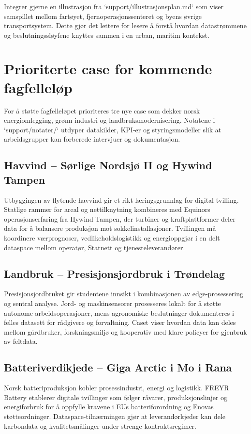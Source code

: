 Integrer gjerne en illustrasjon fra `support/illustrasjonsplan.md` som viser samspillet mellom fartøyet, fjernoperasjonssenteret og byens øvrige transportsystem. Dette gjør det lettere for lesere å forstå hvordan datastrømmene og beslutningssløyfene knyttes sammen i en urban, maritim kontekst.

\section{Prioriterte case for kommende fagfelleløp}
For å støtte fagfelleløpet prioriteres tre nye case som dekker norsk energiomlegging, grønn industri og landbruksmodernisering. Notatene i `support/notater/` utdyper datakilder, KPI-er og styringsmodeller slik at arbeidsgrupper kan forberede intervjuer og dokumentasjon.

\subsection*{Havvind – Sørlige Nordsjø II og Hywind Tampen}
Utbyggingen av flytende havvind gir et rikt læringsgrunnlag for digital tvilling. Statlige rammer for areal og nettilknytning kombineres med Equinors operasjonserfaring fra Hywind Tampen, der turbiner og kraftplattformer deler data for å balansere produksjon mot sokkelinstallasjoner.\citep{nve2023havvindfakta,equinor2023hywindtampen} Tvillingen må koordinere værprognoser, vedlikeholdslogistikk og energioppgjør i en delt dataspace mellom operatør, Statnett og tjenesteleverandører.

\subsection*{Landbruk – Presisjonsjordbruk i Trøndelag}
Presisjonsjordbruket gir studentene innsikt i kombinasjonen av edge-prosessering og sentral analyse. Jord- og maskinsensorer prosesseres lokalt for å støtte autonome arbeidsoperasjoner, mens agronomiske beslutninger dokumenteres i felles datasett for rådgivere og forvaltning.\citep{nibio2023dataflyt,landbruksdir2023digitalisering,etsi2023mec} Caset viser hvordan data kan deles mellom gårdbruker, forskningsmiljø og kooperativ med klare policyer for gjenbruk av feltdata.

\subsection*{Batteriverdikjede – Giga Arctic i Mo i Rana}
Norsk batteriproduksjon kobler prosessindustri, energi og logistikk. FREYR Battery etablerer digitale tvillinger som følger råvarer, produksjonslinjer og energiforbruk for å oppfylle kravene i EUs batteriforordning og Enovas støtteordninger.\citep{freyr2024giga,enova2023batteri,gaiax2023architecture} Dataspace-tilnærmingen gjør at leverandørkjeder kan dele karbondata og kvalitetsmålinger under strenge kontraktsregimer.

